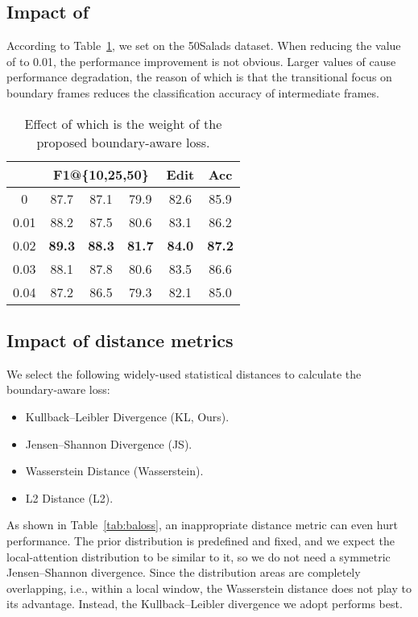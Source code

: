 \documentclass[letterpaper]{article} \usepackage[submission]{aaai23}  \usepackage{times}  \usepackage{helvet}  \usepackage{courier}  \usepackage[hyphens]{url}  \usepackage{graphicx} \urlstyle{rm} \def\UrlFont{\rm}  \usepackage{natbib}  \usepackage{caption} \frenchspacing  \setlength{\pdfpagewidth}{8.5in} \setlength{\pdfpageheight}{11in} \usepackage{algorithm}
\begin{document}
\subsection{Impact of }
According to Table~\ref{tab:beta}, we set  on the 50Salads dataset. When reducing the value of  to 0.01, the performance improvement is not obvious. Larger values of  cause performance degradation, the reason of which is that the transitional focus on boundary frames reduces the classification accuracy of intermediate frames.

\begin{table}[ht]
\centering
\begin{tabular}{cccccc}
    \toprule
        & \multicolumn{3}{c}{F1@\{10,25,50\}} & Edit & Acc\\
    \midrule
    0 & 87.7 & 87.1 & 79.9 & 82.6 & 85.9\\
    0.01 & 88.2 & 87.5 & 80.6 & 83.1 & 86.2\\
    0.02 & \textbf{89.3} & \textbf{88.3} & \textbf{81.7} & \textbf{84.0} & \textbf{87.2}\\
    0.03 & 88.1 & 87.8 & 80.6 & 83.5 & 86.6\\
    0.04 & 87.2 & 86.5 & 79.3 & 82.1 & 85.0\\
    \bottomrule
\end{tabular}
\caption{Effect of  which is the weight of the proposed boundary-aware loss.}
\label{tab:beta}
\end{table}

\subsection{Impact of distance metrics}
We select the following widely-used statistical distances to calculate the boundary-aware loss:
\begin{itemize}
\item Kullback–Leibler Divergence (KL, Ours).
\item Jensen–Shannon Divergence (JS).
\item Wasserstein Distance (Wasserstein).
\item L2 Distance (L2).
\end{itemize}

As shown in Table~\ref{tab:baloss}, an inappropriate distance metric can even hurt performance. The prior distribution is predefined and fixed, and we expect the local-attention distribution to be similar to it, so we do not need a symmetric Jensen–Shannon divergence. Since the distribution areas are completely overlapping, i.e., within a local window, the Wasserstein distance does not play to its advantage. Instead, the Kullback–Leibler divergence we adopt performs best.
\end{document}
